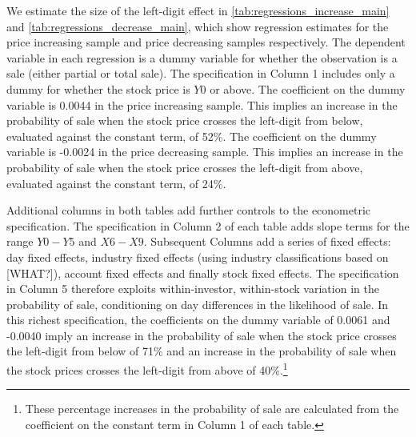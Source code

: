 We estimate the size of the left-digit effect in \ref{tab:regressions_increase_main} and \ref{tab:regressions_decrease_main}, which show regression estimates for the price increasing sample and price decreasing samples respectively. The dependent variable in each regression is a dummy variable for whether the observation is a sale (either partial or total sale). The specification in Column 1 includes only a dummy for whether the stock price is $Y0$ or above. The coefficient on the dummy variable is 0.0044 in the price increasing sample. This implies an increase in the probability of sale when the stock price crosses the left-digit from below, evaluated against the constant term, of 52\%. The coefficient on the dummy variable is -0.0024 in the price decreasing sample. This implies an increase in the probability of sale when the stock price crosses the left-digit from above, evaluated against the constant term, of 24\%. 

Additional columns in both tables add further controls to the econometric specification. The specification in Column 2 of each table adds slope terms for the range $Y0 - Y5$ and $X6 - X9$. Subsequent Columns add a series of fixed effects: day fixed effects, industry fixed effects (using industry classifications based on [WHAT?]), account fixed effects and finally stock fixed effects. The specification in Column 5 therefore exploits within-investor, within-stock variation in the probability of sale, conditioning on day differences in the likelihood of sale. In this richest specification, the coefficients on the dummy variable of 0.0061 and -0.0040 imply an increase in the probability of sale when the stock price crosses the left-digit from below of 71\% and an increase in the probability of sale when the stock prices crosses the left-digit from above of 40\%.\footnote{These percentage increases in the probability of sale are calculated from the coefficient on the constant term in Column 1 of each table.}

